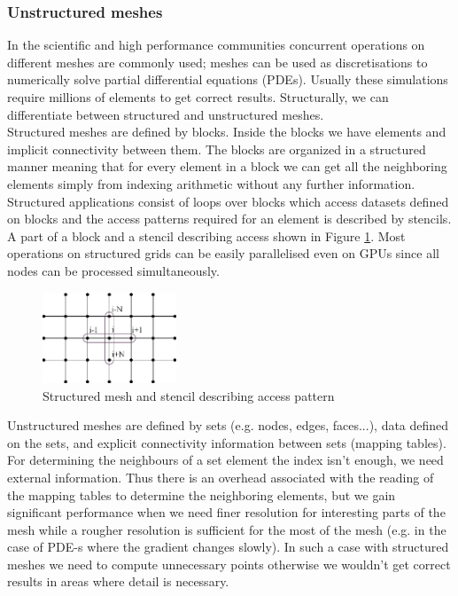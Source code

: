 \subsubsection{Unstructured meshes}\label{unstructured-meshes}
In the scientific and high performance communities concurrent operations on
different meshes are commonly used; meshes can be used as discretisations to
numerically solve partial differential equations (PDEs). Usually these
simulations require millions of elements to get correct results. Structurally,
we can differentiate between structured and unstructured meshes.\\
Structured meshes are defined by blocks. Inside the blocks we have elements and
implicit connectivity between them. The blocks are organized in a structured
manner meaning that for every element in a block we can get all the neighboring
elements simply from indexing arithmetic without any further information.
Structured applications consist of loops over blocks which access datasets
defined on blocks and the access patterns required for an element is described
by stencils. A part of a block and a stencil describing access shown in Figure
\ref{fig:structured}. Most operations on structured grids can be easily
parallelised even on GPUs since all nodes can be processed simultaneously.

\begin{figure}
\centering
\includegraphics[width=4cm]{fig/svg/structured.eps}
\caption{Structured mesh and stencil describing access pattern}
\label{fig:structured}
\end{figure}

Unstructured meshes are defined by sets (e.g. nodes, edges, faces...), data
defined on the sets, and explicit connectivity information between sets
(mapping tables). For determining the neighbours of a set element the index
isn't enough, we need external information. Thus there is an overhead
associated with the reading of the mapping tables to determine the neighboring
elements, but we gain significant performance when we need finer resolution for
interesting parts of the mesh while a rougher resolution is sufficient for the
most of the mesh (e.g. in the case of PDE-s where the gradient changes slowly).
In such a case with structured meshes we need to compute unnecessary points
otherwise we wouldn't get correct results in areas where detail is necessary.

